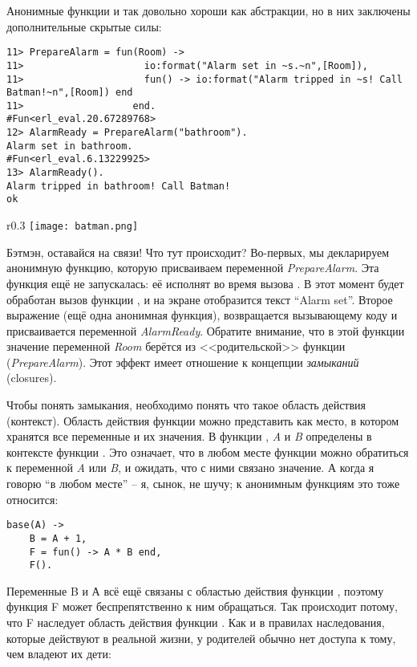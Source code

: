 Анонимные функции и так довольно хороши как абстракции, но в них заключены дополнительные скрытые силы:
\begin{lstlisting}[style=erlang]
11> PrepareAlarm = fun(Room) ->
11>                     io:format("Alarm set in ~s.~n",[Room]),
11>                     fun() -> io:format("Alarm tripped in ~s! Call Batman!~n",[Room]) end
11>                   end.
#Fun<erl_eval.20.67289768>
12> AlarmReady = PrepareAlarm("bathroom").
Alarm set in bathroom.
#Fun<erl_eval.6.13229925>
13> AlarmReady().
Alarm tripped in bathroom! Call Batman!
ok
\end{lstlisting}
\begin{wrapfigure}{r}{0.3\linewidth}
    \texttt{[image: batman.png]}
\end{wrapfigure}
Бэтмэн, оставайся на связи! Что тут происходит? Во\--первых, мы декларируем анонимную функцию, которую присваиваем переменной \emph{PrepareAlarm}. Эта функция ещё не запускалась: её исполнят во время вызова . В этот момент будет обработан вызов функции , и на экране отобразится текст ``Alarm set''. Второе выражение (ещё одна анонимная функция), возвращается вызывающему коду и присваивается переменной \emph{AlarmReady}. Обратите внимание, что в этой функции значение переменной \emph{Room} берётся из <<родительской>> функции (\emph{PrepareAlarm}). Этот эффект имеет отношение к концепции \emph{замыканий} (closures).

Чтобы понять замыкания, необходимо понять что такое область действия (контекст). Область действия функции можно представить как место, в котором хранятся все переменные и их значения. В функции , \emph{A} и \emph{B} определены в контексте функции . Это означает, что в любом месте функции  можно обратиться к переменной \emph{A} или \emph{B}, и ожидать, что с ними связано значение. А когда я говорю ``в любом месте'' \--- я, сынок, не шучу; к анонимным функциям это тоже относится:
\begin{lstlisting}[style=erlang]
base(A) ->
    B = A + 1,
    F = fun() -> A * B end,
    F().
\end{lstlisting}

Переменные B и А всё ещё связаны с областью действия функции , поэтому функция F может беспрепятственно к ним обращаться. Так происходит потому, что F наследует область действия функции . Как и в правилах наследования, которые действуют в реальной жизни, у родителей обычно нет доступа к тому, чем владеют их дети:

